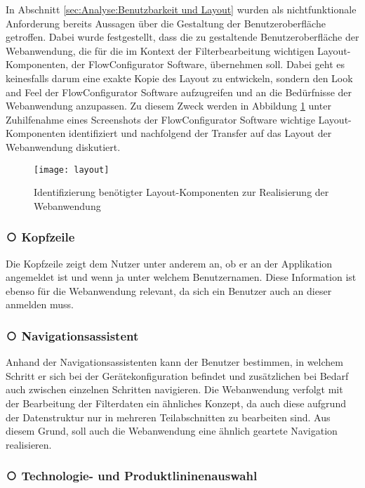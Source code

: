 In Abschnitt \ref{sec:Analyse:Benutzbarkeit und Layout} wurden als nichtfunktionale Anforderung bereits Aussagen über die Gestaltung der Benutzeroberfläche getroffen. Dabei wurde festgestellt, dass die zu gestaltende Benutzeroberfläche der Webanwendung, die für die im Kontext der Filterbearbeitung wichtigen Layout-Komponenten, der FlowConfigurator Software, übernehmen soll. Dabei geht es keinesfalls darum eine exakte Kopie des Layout zu entwickeln, sondern den \grqq{}Look and Feel\grqq{} der FlowConfigurator Software aufzugreifen und an die Bedürfnisse der Webanwendung anzupassen. Zu diesem Zweck werden in Abbildung \ref{fig:layout} unter Zuhilfenahme eines Screenshots der FlowConfigurator Software wichtige Layout-Komponenten identifiziert und nachfolgend der Transfer auf das Layout der Webanwendung diskutiert.

\begin{figure}[H]
\centering
\texttt{[image: layout]}
\caption{Identifizierung benötigter Layout-Komponenten zur Realisierung der Webanwendung}
\label{fig:layout}
\end{figure}

\subsubsection{{\larger\textcircled{}} Kopfzeile}

Die Kopfzeile zeigt dem Nutzer unter anderem an, ob er an der Applikation angemeldet ist und wenn ja unter welchem Benutzernamen. Diese Information ist ebenso für die Webanwendung relevant, da sich ein Benutzer auch an dieser anmelden muss.

\subsubsection{{\larger\textcircled{}} Navigationsassistent}

Anhand der Navigationsassistenten kann der Benutzer bestimmen, in welchem Schritt er sich bei der Gerätekonfiguration befindet und zusätzlichen bei Bedarf auch zwischen einzelnen Schritten navigieren. Die Webanwendung verfolgt mit der Bearbeitung der Filterdaten ein ähnliches Konzept, da auch diese aufgrund der Datenstruktur nur in mehreren Teilabschnitten zu bearbeiten sind. Aus diesem Grund, soll auch die Webanwendung eine ähnlich geartete Navigation realisieren.

\subsubsection{{\larger\textcircled{}} Technologie- und Produktlininenauswahl}

